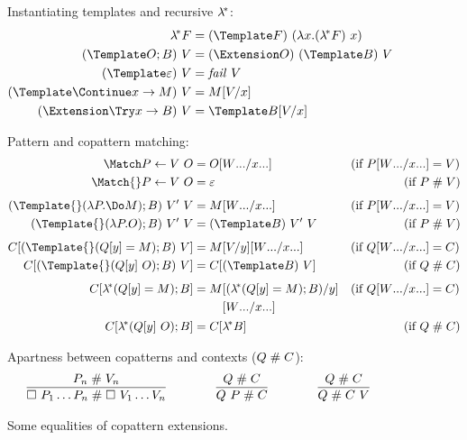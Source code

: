 \documentclass[runningheads]{llncs}
\begin{document}
\begin{figure}
Instantiating templates and recursive $\lambda^{\!*}$:
\begin{align*}
  \lamstar F
  &=
  (\Template F) ~ (\lambda x. (\lamstar F) ~ x)
  \\
  (\Template O; B) ~ V
  &=
  (\Extension O) ~ (\Template B) ~ V
  \\
  (\Template \varepsilon) ~ V
  &=
  \mathit{fail}~V
  \\
  (\Template \Continue x \to M) ~ V
  &=
  M\subst{x}{V}
  \\
  (\Extension \Try x \to B) ~ V
  &=
  \Template B\subst{x}{V}
\end{align*}

Pattern and copattern matching:
\begin{align*}
  \Match P \gets V ~ O
  &=
  O\subst{\many{x}}{\many{W}}
  &(\text{if } P\subst{\many{x}}{\many{W}} &= V)
  \\
  \Match{} P \gets V ~ O
  &=
  \varepsilon
  &(\text{if } P &\apart V)
  \\[1ex]
  (\Template{} (\lambda P. \Do M); B) ~ V' ~ V
  &=
  M\subst{\many{x}}{\many{W}}
  &(\text{if } P\subst{\many{x}}{\many{W}} &= V)
  \\
  (\Template{} (\lambda P. O); B) ~ V' ~ V
  &=
  (\Template B) ~ V' ~ V
  &(\text{if } P &\apart V)
  \\[1ex]
  C[(\Template{} (Q[y] = M); B) ~ V]
  &=
  M\subst{y}{V}\subst{\many{x}}{\many{W}}
  &(\text{if } Q\subst{\many{x}}{\many{W}} &= C)
  \\
  C[(\Template{} (Q[y] ~ O); B) ~ V]
  &=
  C[(\Template B) ~ V]
  &(\text{if } Q &\apart C)
  \\[1ex]
  C[\lamstar (Q[y] = M); B]
  &=
  \begin{aligned}[t]
    M
    &\subst{y}{(\lamstar (Q[y] = M); B)}
    \\
    &\subst{\many{x}}{\many{W}}
  \end{aligned}
  &(\text{if } Q\subst{\many{x}}{\many{W}} &= C)
  \\
  C[\lamstar (Q[y] ~ O); B]
  &=
  C[\lamstar B]
  &(\text{if } Q &\apart C)
\end{align*}

Apartness between copatterns and contexts ($Q \mathrel{\#} C$):
\begin{gather*}
  \infer
  {\hole ~ P_1 \dots P_n \apart \hole ~ V_1 \dots V_n}
  {P_n \apart V_n}
  \qqqquad
  \infer
  {Q ~ P \apart C}
  {Q \apart C}
  \qqqquad
  \infer
  {Q \apart C ~ V}
  {Q \apart C}
\end{gather*}

\caption{Some equalities of copattern extensions.}
\label{fig:source-equality}
\end{figure}
\end{document}
